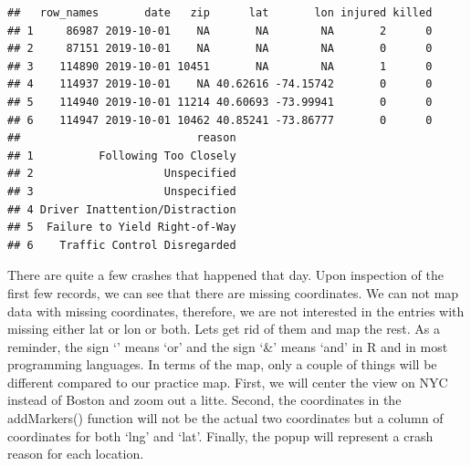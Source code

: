 \documentclass[]{book}
\newenvironment{Shaded}{\begin{snugshade}}{\end{snugshade}}
\newcommand{\CommentTok}[1]{\textcolor[rgb]{0.56,0.35,0.01}{\textit{#1}}}
\newcommand{\DataTypeTok}[1]{\textcolor[rgb]{0.13,0.29,0.53}{#1}}
\newcommand{\DecValTok}[1]{\textcolor[rgb]{0.00,0.00,0.81}{#1}}
\newcommand{\FloatTok}[1]{\textcolor[rgb]{0.00,0.00,0.81}{#1}}
\newcommand{\KeywordTok}[1]{\textcolor[rgb]{0.13,0.29,0.53}{\textbf{#1}}}
\newcommand{\NormalTok}[1]{#1}
\newcommand{\OperatorTok}[1]{\textcolor[rgb]{0.81,0.36,0.00}{\textbf{#1}}}
\newcommand{\StringTok}[1]{\textcolor[rgb]{0.31,0.60,0.02}{#1}}
\begin{document}
\begin{verbatim}
##   row_names       date   zip      lat       lon injured killed
## 1     86987 2019-10-01    NA       NA        NA       2      0
## 2     87151 2019-10-01    NA       NA        NA       0      0
## 3    114890 2019-10-01 10451       NA        NA       1      0
## 4    114937 2019-10-01    NA 40.62616 -74.15742       0      0
## 5    114940 2019-10-01 11214 40.60693 -73.99941       0      0
## 6    114947 2019-10-01 10462 40.85241 -73.86777       0      0
##                           reason
## 1          Following Too Closely
## 2                    Unspecified
## 3                    Unspecified
## 4 Driver Inattention/Distraction
## 5  Failure to Yield Right-of-Way
## 6    Traffic Control Disregarded
\end{verbatim}

There are quite a few crashes that happened that day. Upon inspection of the first few records, we can see that there are missing coordinates. We can not map data with missing coordinates, therefore, we are not interested in the entries with missing either lat or lon or both. Lets get rid of them and map the rest. As a reminder, the sign `\textbar{}' means `or' and the sign `\&' means `and' in R and in most programming languages. In terms of the map, only a couple of things will be different compared to our practice map. First, we will center the view on NYC instead of Boston and zoom out a litte. Second, the coordinates in the addMarkers() function will not be the actual two coordinates but a column of coordinates for both `lng' and `lat'. Finally, the popup will represent a crash reason for each location.

\begin{Shaded}
\end{Shaded}
\end{document}
